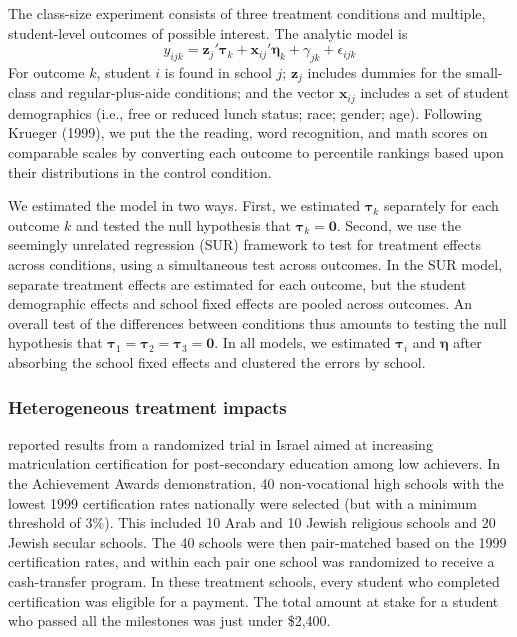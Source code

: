 \documentclass[12pt]{article}
\newcommand{\bm}{\mathbf}
\newcommand{\bs}{\boldsymbol}
\begin{document}
The class-size experiment consists of three treatment conditions and multiple, student-level outcomes of possible interest. The analytic model is 
\begin{equation}
y_{ijk} = \bm{z}_{j}'\bs\tau_k + \bm{x}_{ij}'\bs\eta_{k} + \gamma_{jk} + \epsilon_{ijk}
\end{equation}
For outcome $k$, student $i$ is found in school $j$; $\bm{z}_{j}$ includes dummies for the small-class and regular-plus-aide conditions; and the vector $\bm{x}_{ij}$ includes a set of student demographics (i.e., free or reduced lunch status; race; gender; age). Following Krueger (1999), we put the the reading, word recognition, and math scores on comparable scales by converting each outcome to percentile rankings based upon their distributions in the control condition.

We estimated the model in two ways. First, we estimated $\bs\tau_k$ separately for each outcome $k$ and tested the null hypothesis that $\bs\tau_k = \bm{0}$. Second, we use the seemingly unrelated regression (SUR) framework to test for treatment effects across conditions, using a simultaneous test across outcomes. In the SUR model, separate treatment effects are estimated for each outcome, but the student demographic effects and school fixed effects are pooled across outcomes. An overall test of the differences between conditions thus amounts to testing the null hypothesis that $\bs\tau_1 = \bs\tau_2 = \bs\tau_3 = \bm{0}$. In all models, we estimated $\bs\tau_i$ and $\bs\eta$ after absorbing the school fixed effects and clustered the errors by school.

\subsubsection{Heterogeneous treatment impacts} 

\citet{Angrist2009effects} reported results from a randomized trial in Israel aimed at increasing matriculation certification for post-secondary education among low achievers. 
In the Achievement Awards demonstration, 40 non-vocational high schools with the lowest 1999 certification rates nationally were selected (but with a  minimum threshold of 3\%). This included 10 Arab and 10 Jewish religious schools and 20 Jewish secular schools. The 40 schools were then pair-matched based on the 1999 certification rates, and within each pair one school was randomized to receive a cash-transfer program. In these treatment schools, every student who completed certification was eligible for a payment. The total amount at stake for a student who passed all the milestones was just under \$2,400.   
\end{document}
